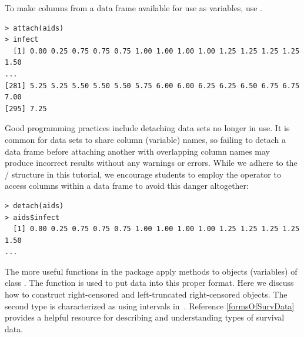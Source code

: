 \documentclass[11pt]{article}
\begin{document}
To make columns from a data frame available for use as variables, use .
\begin{verbatim}
> attach(aids)
> infect
  [1] 0.00 0.25 0.75 0.75 0.75 1.00 1.00 1.00 1.00 1.25 1.25 1.25 1.25 1.50
...
[281] 5.25 5.25 5.50 5.50 5.50 5.75 6.00 6.00 6.25 6.25 6.50 6.75 6.75 7.00
[295] 7.25
\end{verbatim}
Good programming practices include detaching data sets no longer in use. It is common for data sets to share column (variable) names, so failing to detach a data frame before attaching another with overlapping column names may produce incorrect results without any warnings or errors. While we adhere to the / structure in this tutorial, we encourage students to employ the \rcom{\$} operator to access columns within a data frame to avoid this danger altogether:
\begin{verbatim}
> detach(aids)
> aids$infect
  [1] 0.00 0.25 0.75 0.75 0.75 1.00 1.00 1.00 1.00 1.25 1.25 1.25 1.25 1.50
...
\end{verbatim}


\pagebreak

\label{survObjects}

The more useful functions in the  package apply methods to objects (variables) of class . The  function is used to put data into this proper format. Here we discuss how to construct right-censored and left-truncated right-censored  objects. The second type is characterized as using intervals in~. Reference \ref{formsOfSurvData} provides a helpful resource for describing and understanding types of survival data.
\end{document}
